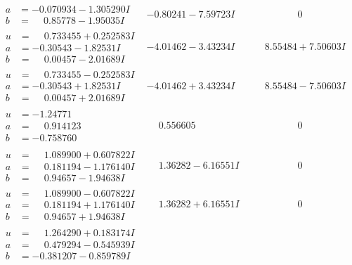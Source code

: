 \documentclass[1p]{elsarticle_modified}
\theoremstyle{definition}
\begin{document}
$$\begin{array}{c|c|c}
\begin{aligned}
a &= -0.070934 - 1.305290 I \\
b &= \phantom{-}0.85778 - 1.95035 I\end{aligned}
 & -0.80241 - 7.59723 I & \phantom{-0.000000 } 0 \\ \hline\begin{aligned}
u &= \phantom{-}0.733455 + 0.252583 I \\
a &= -0.30543 - 1.82531 I \\
b &= \phantom{-}0.00457 - 2.01689 I\end{aligned}
 & -4.01462 - 3.43234 I & \phantom{-}8.55484 + 7.50603 I \\ \hline\begin{aligned}
u &= \phantom{-}0.733455 - 0.252583 I \\
a &= -0.30543 + 1.82531 I \\
b &= \phantom{-}0.00457 + 2.01689 I\end{aligned}
 & -4.01462 + 3.43234 I & \phantom{-}8.55484 - 7.50603 I \\ \hline\begin{aligned}
u &= -1.24771\phantom{ +0.000000I} \\
a &= \phantom{-}0.914123\phantom{ +0.000000I} \\
b &= -0.758760\phantom{ +0.000000I}\end{aligned}
 & \phantom{-}0.556605\phantom{ +0.000000I} & \phantom{-0.000000 } 0 \\ \hline\begin{aligned}
u &= \phantom{-}1.089900 + 0.607822 I \\
a &= \phantom{-}0.181194 - 1.176140 I \\
b &= \phantom{-}0.94657 - 1.94638 I\end{aligned}
 & \phantom{-}1.36282 - 6.16551 I & \phantom{-0.000000 } 0 \\ \hline\begin{aligned}
u &= \phantom{-}1.089900 - 0.607822 I \\
a &= \phantom{-}0.181194 + 1.176140 I \\
b &= \phantom{-}0.94657 + 1.94638 I\end{aligned}
 & \phantom{-}1.36282 + 6.16551 I & \phantom{-0.000000 } 0 \\ \hline\begin{aligned}
u &= \phantom{-}1.264290 + 0.183174 I \\
a &= \phantom{-}0.479294 - 0.545939 I \\
b &= -0.381207 - 0.859789 I\end{aligned}

\end{array}$$
\end{document}

